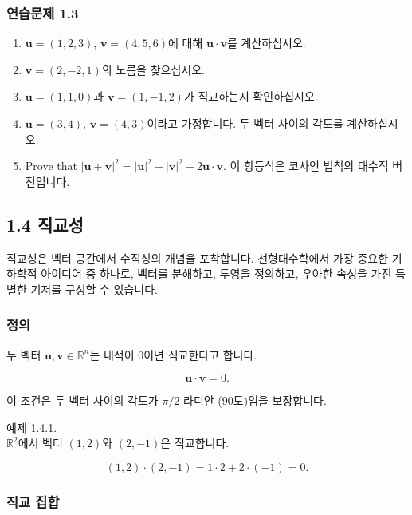 \documentclass[
  12pt,
  a4paper,
]{article}
\begin{document}
\subsubsection{연습문제 1.3}\label{exercises-13}

\begin{enumerate}
\def\labelenumi{\arabic{enumi}.}
\item
  \(\mathbf{u} = (1,2,3)\), \(\mathbf{v} = (4,5,6)\)에 대해 \(\mathbf{u} \cdot \mathbf{v}\)를 계산하십시오.
\item
  \(\mathbf{v} = (2, -2, 1)\)의 노름을 찾으십시오.
\item
  \(\mathbf{u} = (1,1,0)\)과 \(\mathbf{v} = (1,-1,2)\)가 직교하는지 확인하십시오.
\item
  \(\mathbf{u} = (3,4)\), \(\mathbf{v} = (4,3)\)이라고 가정합니다. 두 벡터 사이의 각도를 계산하십시오.
\item
  Prove that
  \(|\mathbf{u} + \mathbf{v}|^2 = |\mathbf{u}|^2 + |\mathbf{v}|^2 + 2\mathbf{u}\cdot \mathbf{v}\).
  이 항등식은 코사인 법칙의 대수적 버전입니다.
\end{enumerate}

\subsection{1.4 직교성}\label{14-orthogonality}

직교성은 벡터 공간에서 수직성의 개념을 포착합니다.
선형대수학에서 가장 중요한 기하학적 아이디어 중 하나로,
벡터를 분해하고, 투영을 정의하고, 우아한 속성을 가진 특별한 기저를 구성할 수 있습니다.

\subsubsection{정의}\label{definition}

두 벡터 \(\mathbf{u}, \mathbf{v} \in \mathbb{R}^n\)는 내적이 0이면 직교한다고 합니다.

\[\mathbf{u} \cdot \mathbf{v} = 0.\]

이 조건은 두 벡터 사이의 각도가 \(\pi/2\) 라디안
(90도)임을 보장합니다.

예제 1.4.1.\\
\(\mathbb{R}^2\)에서 벡터 \((1,2)\)와 \((2,-1)\)은 직교합니다.

\[(1,2) \cdot (2,-1) = 1\cdot 2 + 2\cdot (-1) = 0.\]

\subsubsection{직교 집합}\label{orthogonal-sets}
\end{document}

